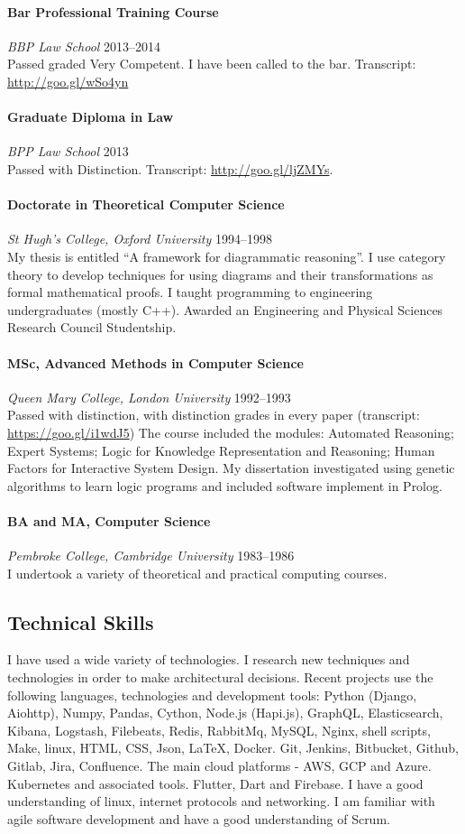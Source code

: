 \documentclass[11pt,a4paper]{article}
\newcommand{\centry}[3]{\paragraph{#1} \textit{#2}%
\hfill#3\\[2pt]}
\begin{document}
\centry{Bar Professional Training Course}{BBP Law School}{2013--2014}
 Passed graded Very Competent. I have been called to the bar. Transcript:
\url{http://goo.gl/wSo4yn}


\centry{Graduate Diploma in Law}{BPP Law School}{2013} 
Passed with Distinction. Transcript: \url{http://goo.gl/ljZMYs}.

\centry{Doctorate in Theoretical Computer Science}{St Hugh's College, Oxford
  University} {1994--1998} My thesis is entitled ``A framework for diagrammatic
reasoning''. I use category theory to develop techniques for using diagrams and
their transformations as formal mathematical proofs.  I taught programming to
engineering undergraduates (mostly C++).  Awarded an Engineering and Physical
Sciences Research Council Studentship.


\centry{MSc, Advanced Methods in Computer Science}{Queen Mary College, London
  University}{1992--1993} Passed with distinction, with distinction grades in
every paper (transcript: \url{https://goo.gl/i1wdJ5}) The course included the
modules: Automated Reasoning; Expert Systems; Logic for Knowledge
Representation and Reasoning; Human Factors for Interactive System Design.  My
dissertation investigated using genetic algorithms to learn logic programs and
included software implement in Prolog.


\centry{BA and MA, Computer Science}{Pembroke College, Cambridge University}{1983--1986}
I undertook a variety of theoretical and practical computing courses.

\subsection*{Technical Skills}

I have used a wide variety of technologies. I research new techniques and
technologies in order to make architectural decisions. Recent projects use the
following languages, technologies and development tools: Python (Django,
Aiohttp), Numpy, Pandas, Cython, Node.js (Hapi.js), GraphQL, Elasticsearch,
Kibana, Logstash, Filebeats, Redis, RabbitMq, MySQL, Nginx, shell scripts,
Make, linux, HTML, CSS, Json, \LaTeX, Docker.  Git, Jenkins, Bitbucket, Github,
Gitlab, Jira, Confluence. The main cloud platforms - AWS, GCP and
Azure. Kubernetes and associated tools. Flutter, Dart and Firebase. I have a
good understanding of linux, internet protocols and networking. I am familiar
with agile software development and have a good understanding of Scrum.
\end{document}
